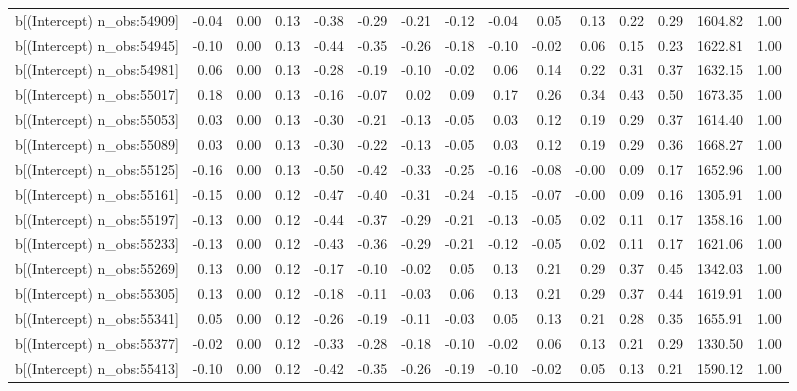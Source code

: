 \begin{table}[ht]
\begin{tabular}{rrrrrrrrrrrrrrr}
  b[(Intercept) n\_obs:54909] & -0.04 & 0.00 & 0.13 & -0.38 & -0.29 & -0.21 & -0.12 & -0.04 & 0.05 & 0.13 & 0.22 & 0.29 & 1604.82 & 1.00 \\ 
  b[(Intercept) n\_obs:54945] & -0.10 & 0.00 & 0.13 & -0.44 & -0.35 & -0.26 & -0.18 & -0.10 & -0.02 & 0.06 & 0.15 & 0.23 & 1622.81 & 1.00 \\ 
  b[(Intercept) n\_obs:54981] & 0.06 & 0.00 & 0.13 & -0.28 & -0.19 & -0.10 & -0.02 & 0.06 & 0.14 & 0.22 & 0.31 & 0.37 & 1632.15 & 1.00 \\ 
  b[(Intercept) n\_obs:55017] & 0.18 & 0.00 & 0.13 & -0.16 & -0.07 & 0.02 & 0.09 & 0.17 & 0.26 & 0.34 & 0.43 & 0.50 & 1673.35 & 1.00 \\ 
  b[(Intercept) n\_obs:55053] & 0.03 & 0.00 & 0.13 & -0.30 & -0.21 & -0.13 & -0.05 & 0.03 & 0.12 & 0.19 & 0.29 & 0.37 & 1614.40 & 1.00 \\ 
  b[(Intercept) n\_obs:55089] & 0.03 & 0.00 & 0.13 & -0.30 & -0.22 & -0.13 & -0.05 & 0.03 & 0.12 & 0.19 & 0.29 & 0.36 & 1668.27 & 1.00 \\ 
  b[(Intercept) n\_obs:55125] & -0.16 & 0.00 & 0.13 & -0.50 & -0.42 & -0.33 & -0.25 & -0.16 & -0.08 & -0.00 & 0.09 & 0.17 & 1652.96 & 1.00 \\ 
  b[(Intercept) n\_obs:55161] & -0.15 & 0.00 & 0.12 & -0.47 & -0.40 & -0.31 & -0.24 & -0.15 & -0.07 & -0.00 & 0.09 & 0.16 & 1305.91 & 1.00 \\ 
  b[(Intercept) n\_obs:55197] & -0.13 & 0.00 & 0.12 & -0.44 & -0.37 & -0.29 & -0.21 & -0.13 & -0.05 & 0.02 & 0.11 & 0.17 & 1358.16 & 1.00 \\ 
  b[(Intercept) n\_obs:55233] & -0.13 & 0.00 & 0.12 & -0.43 & -0.36 & -0.29 & -0.21 & -0.12 & -0.05 & 0.02 & 0.11 & 0.17 & 1621.06 & 1.00 \\ 
  b[(Intercept) n\_obs:55269] & 0.13 & 0.00 & 0.12 & -0.17 & -0.10 & -0.02 & 0.05 & 0.13 & 0.21 & 0.29 & 0.37 & 0.45 & 1342.03 & 1.00 \\ 
  b[(Intercept) n\_obs:55305] & 0.13 & 0.00 & 0.12 & -0.18 & -0.11 & -0.03 & 0.06 & 0.13 & 0.21 & 0.29 & 0.37 & 0.44 & 1619.91 & 1.00 \\ 
  b[(Intercept) n\_obs:55341] & 0.05 & 0.00 & 0.12 & -0.26 & -0.19 & -0.11 & -0.03 & 0.05 & 0.13 & 0.21 & 0.28 & 0.35 & 1655.91 & 1.00 \\ 
  b[(Intercept) n\_obs:55377] & -0.02 & 0.00 & 0.12 & -0.33 & -0.28 & -0.18 & -0.10 & -0.02 & 0.06 & 0.13 & 0.21 & 0.29 & 1330.50 & 1.00 \\ 
  b[(Intercept) n\_obs:55413] & -0.10 & 0.00 & 0.12 & -0.42 & -0.35 & -0.26 & -0.19 & -0.10 & -0.02 & 0.05 & 0.13 & 0.21 & 1590.12 & 1.00 \\ 

\end{tabular}
\end{table}
